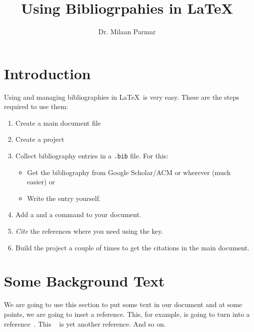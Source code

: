\documentclass{article}
\begin{document}
\title{Using Bibliogrpahies in \LaTeX}
\author{Dr. Milaan Parmar}
\maketitle


\section{Introduction} 
Using and managing bibliographies in \LaTeX\ is very easy. These are the steps required to use them: 

\begin{enumerate}
	\item Create a main document file 
	\item Create a project
	\item Collect bibliography entries in a \verb|.bib| file. For this: 
	   \begin{itemize}
	     \item Get the bibliography from Google Scholar/ACM or wherever (much easier) or 
	     \item Write the entry yourself. 
     \end{itemize}
	\item Add a \verb|| and a \verb|| command to your document. 
	\item \emph{Cite} the references where you need using the key. 
	\item Build the project a couple of times to get the citations in the main document. 
\end{enumerate}

\section{Some Background Text}
We are going to use this section to put some text in our document and at some points, we are going to inset a reference. This, for example, is going to turn into a reference~\cite{se-cs-collab:nauman10}. This ~\cite{nauman2011using} is yet another reference. And so on.\cite{seo2011user}






\end{document}
